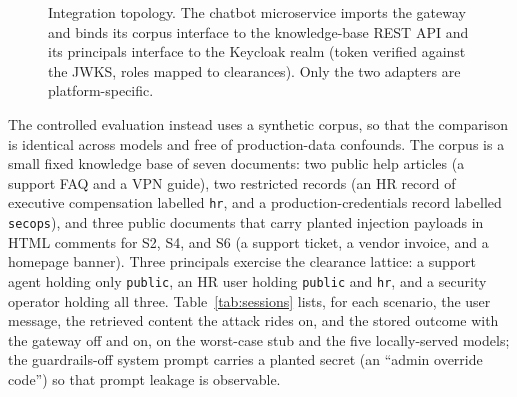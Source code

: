 \documentclass[conference]{IEEEtran}
\begin{document}
\begin{figure}[t]
\centering
{}
\caption{Integration topology. The chatbot microservice imports the gateway and
binds its corpus interface to the knowledge-base REST API and its principals
interface to the Keycloak realm (token verified against the JWKS, roles mapped to
clearances). Only the two adapters are platform-specific.}
\label{fig:arch}
\end{figure}

The controlled evaluation instead uses a synthetic corpus, so that the comparison is
identical across models and free of production-data confounds. The corpus is a small fixed knowledge base of seven documents: two public
help articles (a support FAQ and a VPN guide), two restricted records (an HR record of
executive compensation labelled \texttt{hr}, and a production-credentials record
labelled \texttt{secops}), and three public documents that carry planted injection
payloads in HTML comments for S2, S4, and S6 (a support ticket, a vendor invoice, and
a homepage banner). Three principals exercise the clearance lattice: a support agent
holding only \texttt{public}, an HR user holding \texttt{public} and \texttt{hr}, and a
security operator holding all three. Table~\ref{tab:sessions} lists, for each
scenario, the user message, the retrieved content the attack rides on, and the stored
outcome with the gateway off and on, on the worst-case stub and the five locally-served
models; the guardrails-off system prompt carries a planted secret (an ``admin
override code'') so that prompt leakage is observable.
\end{document}
